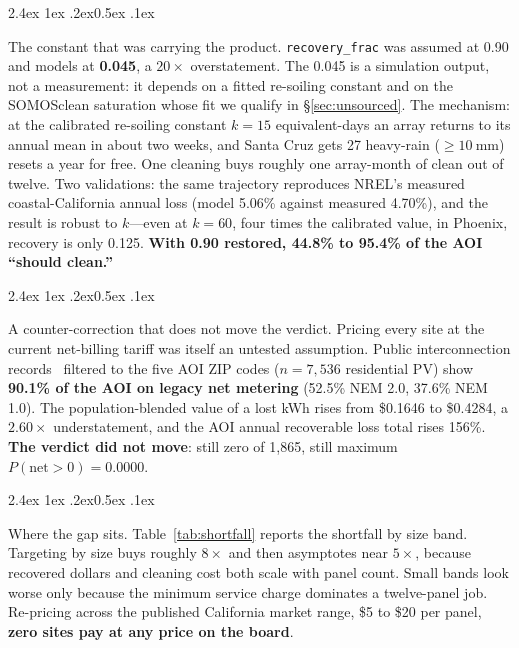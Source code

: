 \documentclass[10pt,twocolumn]{article}
\makeatletter
\renewcommand\paragraph{\@startsection{paragraph}{4}{\z@}%
  {2.4ex \@plus1ex \@minus.2ex}{0.5ex \@plus .1ex}%
  {\normalfont\normalsize\bfseries\raggedright}}
\makeatother
\begin{document}
\paragraph{The constant that was carrying the product.}
\texttt{recovery\_frac} was assumed at 0.90 and models at \textbf{0.045}, a $20\times$
overstatement. The 0.045 is a simulation output, not a measurement: it depends on a
fitted re-soiling constant and on the SOMOSclean saturation whose fit we qualify in
\S\ref{sec:unsourced}. The mechanism: at the calibrated re-soiling constant $k=15$
equivalent-days an array returns to its annual mean in about two weeks, and Santa Cruz
gets 27 heavy-rain ($\geq\SI{10}{\milli\metre}$) resets a year for free. One cleaning buys
roughly one array-month of clean out of twelve. Two validations: the same trajectory
reproduces NREL's measured coastal-California annual loss (model 5.06\% against measured
4.70\%), and the result is robust to $k$---even at $k=60$, four times the calibrated
value, in Phoenix, recovery is only 0.125. \textbf{With 0.90 restored, 44.8\% to 95.4\% of
the AOI ``should clean.''}

\paragraph{A counter-correction that does not move the verdict.}
Pricing every site at the current net-billing tariff was itself an untested assumption.
Public interconnection records~\cite{dgstats} filtered to the five AOI ZIP codes
($n=7{,}536$ residential PV) show \textbf{90.1\% of the AOI on legacy net metering}
(52.5\% NEM 2.0, 37.6\% NEM 1.0). The population-blended value of a lost kWh rises from
\$0.1646 to \$0.4284, a $2.60\times$ understatement, and the AOI annual
recoverable loss total rises 156\%. \textbf{The verdict did not move}: still zero of
1{,}865, still maximum $P(\text{net}>0) = 0.0000$.

\paragraph{Where the gap sits.}
Table~\ref{tab:shortfall} reports the shortfall by size band. Targeting by size buys
roughly $8\times$ and then asymptotes near $5\times$, because recovered dollars and
cleaning cost both scale with panel count. Small bands look worse only because the minimum
service charge dominates a twelve-panel job. Re-pricing across the published California
market range, \$5 to \$20 per panel, \textbf{zero sites pay at any price on the board}.
\end{document}
